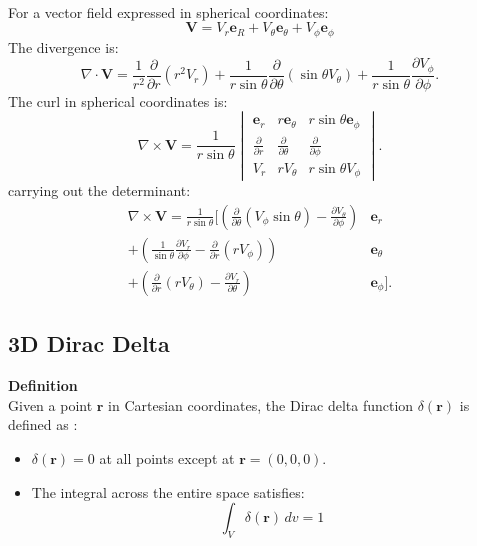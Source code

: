 \documentclass[main]{subfiles}
\begin{document}
\noindent\\
For a vector field expressed in spherical coordinates:
\[
\mathbf{V} = V_r \mathbf{e}_R + V_\theta \mathbf{e}_{\theta} + V_\phi \mathbf{e}_\phi 
\]
The divergence is:
\begin{equation}
\nabla \cdot \mathbf{V} = \frac{1}{r^2} \frac{\partial}{\partial r} (r^2 V_r) + 
\frac{1}{r \sin \theta} \frac{\partial}{\partial \theta} (\sin \theta V_\theta) 
+ \frac{1}{r \sin \theta} \frac{\partial V_\phi}{\partial \phi}.
\end{equation}
The curl in spherical coordinates is:
\begin{equation}
\nabla \times \mathbf{V} = \frac{1}{r \sin \theta} \begin{vmatrix} 
 \mathbf{e}_r & r  \mathbf{e}_\theta & r \sin \theta \mathbf{e}_\phi \\ 
 \frac{\partial}{\partial r} & \frac{\partial}{\partial \theta} & 
 \frac{\partial}{\partial \phi} \\ 
 V_r & r V_\theta & r \sin \theta V_\phi 
    \end{vmatrix}.
    \label{curl_spher}
\end{equation}
carrying out the determinant:
\begin{equation}
\begin{aligned}
\nabla \times \mathbf{V} = \frac{1}{r \sin \theta} \Bigg[ 
 \left( \frac{\partial}{\partial \theta} (V_\phi \sin \theta) - 
 \frac{\partial V_\theta}{\partial \phi} \right)  &\mathbf{e}_r \\
 + \left( \frac{1}{\sin \theta} \frac{\partial V_r}{\partial \phi} - 
 \frac{\partial}{\partial r} (r V_\phi) \right)  &\mathbf{e}_\theta \\
 + \left( \frac{\partial}{\partial r} (r V_\theta) - \frac{\partial V_r}{\partial 
    \theta} \right)  &\mathbf{e}_\phi 
\Bigg].
\end{aligned}
\end{equation}

\subsection{3D Dirac Delta}
\textbf{Definition}\noindent\\
Given a point \(\mathbf{r}\) in Cartesian coordinates, the Dirac delta function 
\(\delta(\mathbf{r})\) is defined as \cite{book-magnetism2}:
\begin{itemize}
    \item \(\delta(\mathbf{r}) = 0\) at all points except at \(\mathbf{r} = 
 (0,0,0)\).
    \item The integral across the entire space satisfies:
    \begin{equation}
    \int_V \delta(\mathbf{r}) \, dv = 1
    \label{eq:dirac}
    \end{equation}
\end{itemize}
\end{document}

